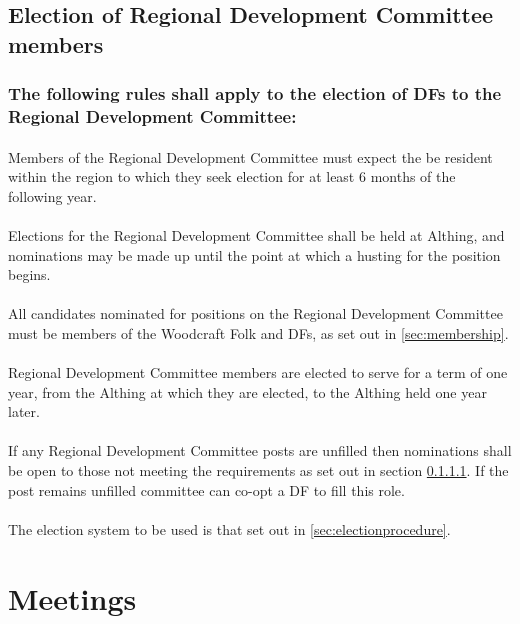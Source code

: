 \documentclass[a4paper, 12pt]{article}
\begin{document}
\subsection{Election of Regional Development Committee members}
\subsubsection{The following rules shall apply to the election of DFs to the Regional Development Committee:}
\paragraph{}
\label{sec:regionalresidency}
Members of the Regional Development Committee must expect the be resident within the region to which they seek election for at least 6 months of the following year.
\paragraph{}
Elections for the Regional Development Committee shall be held at Althing, and nominations may be made up until the point at which a husting for the position begins.
\paragraph{}
All candidates nominated for positions on the Regional Development Committee must be members of the Woodcraft Folk and DFs, as set out in \ref{sec:membership}.
\paragraph{}
Regional Development Committee members are elected to serve for a term of one year, from the Althing at which they are elected, to the Althing held one year later.
\paragraph{}
If any Regional Development Committee posts are unfilled then nominations shall be open to those not meeting the requirements as set out in section \ref{sec:regionalresidency}. If the post remains unfilled committee can co-opt a DF to fill this role.
\paragraph{}
The election system to be used is that set out in \ref{sec:electionprocedure}.

\section{Meetings}
\end{document}
